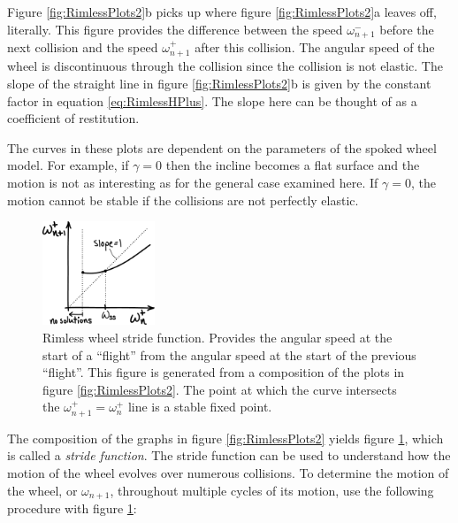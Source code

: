 Figure \ref{fig:RimlessPlots2}b picks up where figure \ref{fig:RimlessPlots2}a leaves off, literally. This figure provides the difference between the speed $\omega_{n+1}^{-}$ before the next collision and the speed $\omega_{n+1}^{+}$ after this collision. The angular speed of the wheel is discontinuous through the collision since the collision is not elastic. The slope of the straight line in figure \ref{fig:RimlessPlots2}b is given by the constant factor in equation \ref{eq:RimlessHPlus}. The slope here can be thought of as a coefficient of restitution.

The curves in these plots are dependent on the parameters of the spoked wheel model. For example, if $\gamma = 0$ then the incline becomes a flat surface and the motion is not as interesting as for the general case examined here. If $\gamma = 0$, the motion cannot be stable if the collisions are not perfectly elastic. 

\begin{figure}[h]		%
\begin{centering}
\includegraphics[width=0.3\textwidth]{Figures/RimlessStrideFunction}\par
\end{centering}
\caption[Plot: Rimless Wheel Stride Function]{Rimless wheel stride function. Provides the angular speed at the start of a ``flight'' from the angular speed at the start of the previous ``flight''. This figure is generated from a composition of the plots in figure \ref{fig:RimlessPlots2}. The point at which the curve intersects the $\omega_{n+1}^{+} = \omega_{n}^{+}$ line is a stable fixed point.}
\label{fig:RimlessStrideFunction}
\end{figure}
%

The composition of the graphs in figure \ref{fig:RimlessPlots2} yields figure \ref{fig:RimlessStrideFunction}, which is called a \emph{stride function}. The stride function can be used to understand how the motion of the wheel evolves over numerous collisions. To determine the motion of the wheel, or $\omega_{n+1}$, throughout multiple cycles of its motion, use the following procedure with figure \ref{fig:RimlessStrideFunction}:


